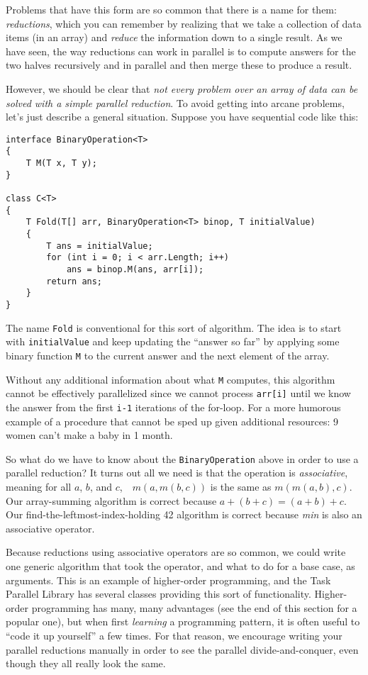 \documentclass[10pt]{article}
\begin{document}
Problems that have this form are so common that there is a
name for them: \emph{reductions}, which you can remember by
realizing that we take a collection of data items (in an array) and
\emph{reduce} the information down to a single result.  As we have
seen, the way reductions can work in parallel is to compute answers
for the two halves recursively and in parallel and then merge these to
produce a result.  

However, we should be clear that \emph{not every problem over an array
  of data can be solved with a simple parallel reduction}.  To avoid
  getting into arcane problems, let's just describe a general
  situation.  Suppose you have sequential code like this:
\begin{verbatim}
interface BinaryOperation<T>
{
    T M(T x, T y);
}

class C<T>
{
    T Fold(T[] arr, BinaryOperation<T> binop, T initialValue)
    {
        T ans = initialValue;
        for (int i = 0; i < arr.Length; i++)
            ans = binop.M(ans, arr[i]);
        return ans;
    }
}
\end{verbatim}
The name {\tt Fold} is conventional for this sort of algorithm.  The
idea is to start with {\tt initialValue} and keep updating the
``answer so far'' by applying some binary function {\tt M} to the
current answer and the next element of the array.

Without any additional information about what {\tt M} computes,
this algorithm cannot be effectively parallelized since we cannot
process {\tt arr[i]} until we know the answer from the first {\tt i-1}
iterations of the for-loop.  For a more humorous example of a
procedure that cannot be sped up given additional resources:
9 women can't make a baby in 1 month.

So what do we have to know about the {\tt BinaryOperation} above in
order to use a parallel reduction?  It turns out all we need is that
the operation is \emph{associative}, meaning for all $a$, $b$, and
$c$,\ \ $m(a,m(b,c))$ is the same as $m(m(a,b),c)$.  Our
array-summing algorithm is correct because $a+(b+c)=(a+b)+c$.  Our
find-the-leftmost-index-holding 42 algorithm is correct because
\emph{min} is also an associative operator.

Because reductions using associative operators are so common, we could
write one generic algorithm that took the operator, and what to do for
a base case, as arguments.  This is an example of higher-order
programming, and the Task Parallel Library has several classes providing
this sort of functionality.  Higher-order programming has many, many
advantages (see the end of this section for a popular one), but when first
\emph{learning} a programming pattern, it is often useful to ``code it
up yourself'' a few times.  For that reason, we encourage writing your
parallel reductions manually in order to see the parallel
divide-and-conquer, even though they all really look the same.
\end{document}
